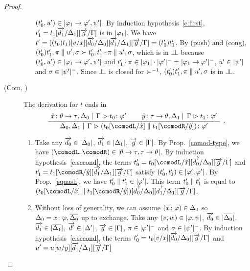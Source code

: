 \begin{proof}
\begin{description}
\begin{enumerate}[label=\textit{(\arabic{*})}]
		    $(t_0',u')\in|{\varphi_1\rightarrow\varphi',\psi'}|$.
		    By induction hypothesis~\ref{c:first},
		    $t_1'=t_1[\overrightarrow{d_1}/\Delta_1][\overrightarrow g/\Gamma]$ is in
		    $|{\varphi_1}|$.
		    We have $t' =
		    ((t_0)t_1)[v/x][\overrightarrow{d_0}/\overline{\Delta_0}][\overrightarrow{d_1}/\Delta_1][\overrightarrow
		    g/\Gamma] = (t_0')t_1'$.
		    By (push) and (cong), $(t_0')t_1',\pi\parallel
		    u',\sigma\succ t_0',t_1'\cdot\pi\parallel u',\sigma$,
		    which is in $\bbot$ because
		    $(t_0',u')\in|{\varphi_1\rightarrow\varphi',\psi'}|$ and
		    $t_1'\cdot\pi\in |{\varphi_1}|\cdot|{\varphi'}|^- =
		    |{\varphi_1\rightarrow\varphi'}|^-$, $u'\in|{\psi'}|$
		    and $\sigma\in|{\psi'}|^-$.
		    Since $\bbot$ is closed for $\succ^{-1}$,
		    $(t_0')t_1',\pi\parallel u',\sigma$ is in $\bbot$.
       \end{enumerate}
  \item[(Com, \textminus)]
       The derivation for $t$ ends in
       \[
       \aseq{\tj{\hat x}{\theta\imp\tau},\D_0}{\G}{\tj{t_0}{\phi'}}
       \aseq{\tj{\hat y}{\tau\imp\theta},\D_1}{\G}{\tj{t_1}{\phi'}}
       \bseq{\D_0,\D_1}\G{\tj{(t_0[\comodL/\hat x]\conc t_1[\comodR/\hat
       y])}{\phi'}}
       \DisplayProof\enspace.
       \]
       \begin{enumerate}[label=\textit{(\arabic{*})}]
	\item Take any
	      $\overrightarrow{d_0}\in|{\Delta_0}|$,
	      $\overrightarrow{d_1}\in|{\Delta_1}|$,
	      $\overrightarrow{g}  \in|{\Gamma}|$.
	      By Prop.~\ref{comod-type}, we have
	      $(\comodL,\comodR)\in\sem{\theta\imp\tau,\tau\imp\theta}$.
	      By induction hypothesis~\ref{c:second}, the terms
	      $t_0'=t_0[\comodL/\hat x][\vec{d_0}/\D_0][\vec g/\G]$
	      and
	      $t_1'=t_1[\comodR/\hat y][\vec{d_1}/\D_1][\vec g/\G]$
	      satisfy
	      $(t_0',t_1')\in|{\varphi',\varphi'}|$.
	      By Prop.~\ref{squash}, we have $t_0'\parallel
	      t_1'\in|{\varphi'}|$.
	      This term $t_0'\parallel t_1'$ is equal to
	      $(t_0[\comodL/\hat x]\conc t_1[\comodR/\hat
	      y])[\vec{d_0}/\D_0][\vec{d_1}/\D_1][\vec g/\G]$.
	\item Without loss of generality,
	      we can assume $({x} \colon{\varphi})\in\Delta_0$ so
	      $\Delta_0 ={x} \colon{\varphi}, \overline{\Delta_0}$ up to exchange.
	      Take any
	      $(v,w)\in|{\varphi,\psi}|$,
	      $\overrightarrow{d_0}\in|{\overline{\Delta_0}}|$,
	      $\overrightarrow{d_1}\in|{\overline{\Delta_1}}|$,
	      $\overrightarrow{d'}\in|{\Delta'}|$,
	      $\overrightarrow g\in |{\Gamma}|$,
	      $\pi\in|{\varphi'}|^-$ and
	      $\sigma\in|{\psi'}|^-$.
	      By induction hypothesis~\ref{c:second},
	      the terms $t_0'=t_0[v/x][\overrightarrow{d_0}/\overline{\Delta_0}][\overrightarrow
	      g/\Gamma]$
	      and
	      $u'=u[w/y][\overrightarrow{d_1}/\Delta_1][\overrightarrow g/\Gamma]$

\end{enumerate}
\end{description}
\end{proof}
